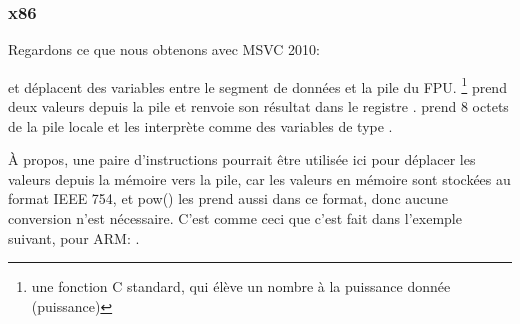 \subsubsection{x86}

Regardons ce que nous obtenons avec MSVC 2010:




\FLD et \FSTP déplacent des variables entre le segment de données et la pile du FPU.
\footnote{une fonction C standard, qui élève un nombre à la puissance
donnée (puissance)} prend deux valeurs depuis la pile et renvoie son résultat dans
le registre .
\printf prend 8 octets de la pile locale et les interprète comme des variables de
type \Tdouble.

À propos, une paire d'instructions \MOV pourrait être utilisée ici pour déplacer
les valeurs depuis la mémoire vers la pile, car les valeurs en mémoire sont stockées
au format IEEE 754, et pow() les prend aussi dans ce format, donc aucune conversion
n'est nécessaire.
C'est comme ceci que c'est fait dans l'exemple suivant, pour ARM: .

